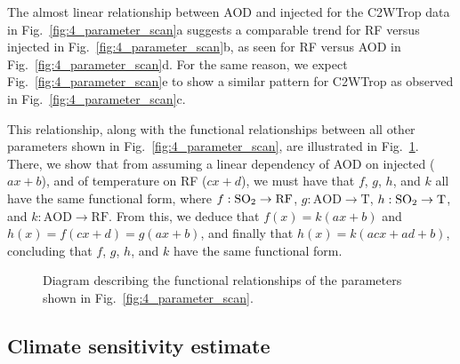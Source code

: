 \documentclass[draft]{agujournal2019}
\begin{document}
  The almost linear relationship between AOD and injected  for the C2WTrop data
  in Fig.~\ref{fig:4_parameter_scan}a suggests a comparable trend for RF versus injected
   in Fig.~\ref{fig:4_parameter_scan}b, as seen for RF versus AOD in
  Fig.~\ref{fig:4_parameter_scan}d. For the same reason, we expect
  Fig.~\ref{fig:4_parameter_scan}e to show a similar pattern for C2WTrop as observed in
  Fig.~\ref{fig:4_parameter_scan}c.

  This relationship, along with the functional relationships between all other
  parameters shown in Fig.~\ref{fig:4_parameter_scan}, are illustrated in
  Fig.~\ref{fig:5_diagram_of_function_relations}. There, we show that from assuming a
  linear dependency of AOD on injected  (\(ax+b\)), and of temperature on RF
  (\(cx+d\)), we must have that \(f\), \(g\), \(h\), and \(k\) all have the same
  functional form, where \(f: \ce{SO2} \to \mathrm{RF}\), \(g: \mathrm{AOD} \to
  \mathrm{T}\), \(h: \ce{SO2} \to \mathrm{T}\), and \(k: \mathrm{AOD} \to \mathrm{RF}\).
  From this, we deduce that \(f(x)=k(ax+b)\) and \(h(x)=f(cx+d)=g(ax+b)\), and finally
  that \(h(x)=k(acx+ad+b)\), concluding that \(f\), \(g\), \(h\), and \(k\) have the
  same functional form.

  \begin{figure}
    \centering


    \caption{Diagram describing the functional relationships of the parameters shown in
      Fig.~\ref{fig:4_parameter_scan}.}\label{fig:5_diagram_of_function_relations}%
  \end{figure}

  \subsection{Climate sensitivity estimate}
\end{document}
